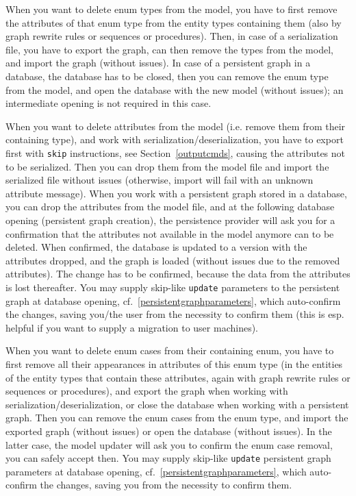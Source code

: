When you want to delete enum types from the model, you have to first remove the attributes of that enum type from the entity types containing them (also by graph rewrite rules or sequences or procedures).
Then, in case of a serialization file, you have to export the graph, can then remove the types from the model, and import the graph (without issues).
In case of a persistent graph in a database, the database has to be closed, then you can remove the enum type from the model, and open the database with the new model (without issues); an intermediate opening is not required in this case. 

When you want to delete attributes from the model (i.e. remove them from their containing type), and work with serialization/deserialization, you have to export first with \texttt{skip} instructions, see Section~\ref{outputcmds}, causing the attributes not to be serialized.
Then you can drop them from the model file and import the serialized file without issues (otherwise, import will fail with an unknown attribute message).
When you work with a persistent graph stored in a database, you can drop the attributes from the model file, and at the following database opening (persistent graph creation), the persistence provider will ask you for a confirmation that the attributes not available in the model anymore can to be deleted.
When confirmed, the database is updated to a version with the attributes dropped, and the graph is loaded (without issues due to the removed attributes).
The change has to be confirmed, because the data from the attributes is lost thereafter.
You may supply skip-like \texttt{update} parameters to the persistent graph at database opening, cf.~\ref{persistentgraphparameters}, which auto-confirm the changes, saving you/the user from the necessity to confirm them
(this is esp. helpful if you want to supply a migration to user machines).

When you want to delete enum cases from their containing enum, you have to first remove all their appearances in attributes of this enum type (in the entities of the entity types that contain these attributes, again with graph rewrite rules or sequences or procedures),
and export the graph when working with serialization/deserialization,
or close the database when working with a persistent graph.
Then you can remove the enum cases from the enum type, and import the exported graph (without issues) or open the database (without issues).
In the latter case, the model updater will ask you to confirm the enum case removal, you can safely accept then.
You may supply skip-like \texttt{update} persistent graph parameters at database opening, cf.~\ref{persistentgraphparameters}, which auto-confirm the changes, saving you from the necessity to confirm them.

